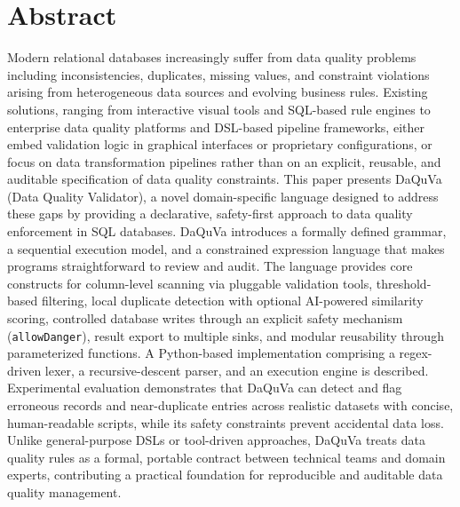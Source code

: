 \chapter*{Abstract}

Modern relational databases increasingly suffer from data quality problems
including inconsistencies, duplicates, missing values, and constraint violations
arising from heterogeneous data sources and evolving business rules. Existing
solutions, ranging from interactive visual tools and SQL-based rule engines to
enterprise data quality platforms and DSL-based pipeline frameworks, either embed
validation logic in graphical interfaces or proprietary configurations, or focus
on data transformation pipelines rather than on an explicit, reusable, and
auditable specification of data quality constraints. This paper presents DaQuVa
(Data Quality Validator), a novel domain-specific language designed to address
these gaps by providing a declarative, safety-first approach to data quality
enforcement in SQL databases. DaQuVa introduces a formally defined grammar, a
sequential execution model, and a constrained expression language that makes
programs straightforward to review and audit. The language provides core
constructs for column-level scanning via pluggable validation tools,
threshold-based filtering, local duplicate detection with optional AI-powered
similarity scoring, controlled database writes through an explicit safety
mechanism (\texttt{allowDanger}), result export to multiple sinks, and modular
reusability through parameterized functions. A Python-based implementation
comprising a regex-driven lexer, a recursive-descent parser, and an execution
engine is described. Experimental evaluation demonstrates that DaQuVa can detect
and flag erroneous records and near-duplicate entries across realistic datasets
with concise, human-readable scripts, while its safety constraints prevent
accidental data loss. Unlike general-purpose DSLs or tool-driven approaches,
DaQuVa treats data quality rules as a formal, portable contract between technical
teams and domain experts, contributing a practical foundation for reproducible
and auditable data quality management.

